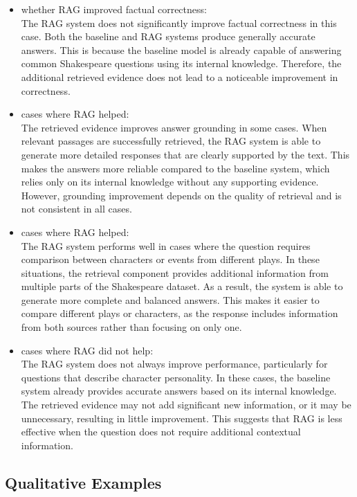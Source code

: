\documentclass[10pt,conference]{IEEEtran}
\begin{document}
\begin{itemize}
    \item whether RAG improved factual correctness:\\
    The RAG system does not significantly improve factual correctness in this case. Both the baseline and RAG systems produce generally accurate answers. This is because the baseline model is already capable of answering common Shakespeare questions using its internal knowledge. Therefore, the additional retrieved evidence does not lead to a noticeable improvement in correctness.
    \item cases where RAG helped:\\
    The retrieved evidence improves answer grounding in some cases. When relevant passages are successfully retrieved, the RAG system is able to generate more detailed responses that are clearly supported by the text. This makes the answers more reliable compared to the baseline system, which relies only on its internal knowledge without any supporting evidence. However, grounding improvement depends on the quality of retrieval and is not consistent in all cases.
    \item cases where RAG helped:\\
    The RAG system performs well in cases where the question requires comparison between characters or events from different plays. In these situations, the retrieval component provides additional information from multiple parts of the Shakespeare dataset. As a result, the system is able to generate more complete and balanced answers. This makes it easier to compare different plays or characters, as the response includes information from both sources rather than focusing on only one.
    \item cases where RAG did not help:\\
    The RAG system does not always improve performance, particularly for questions that describe character personality. In these cases, the baseline system already provides accurate answers based on its internal knowledge. The retrieved evidence may not add significant new information, or it may be unnecessary, resulting in little improvement. This suggests that RAG is less effective when the question does not require additional contextual information.
    
\end{itemize}

\subsection{Qualitative Examples}
\end{document}
